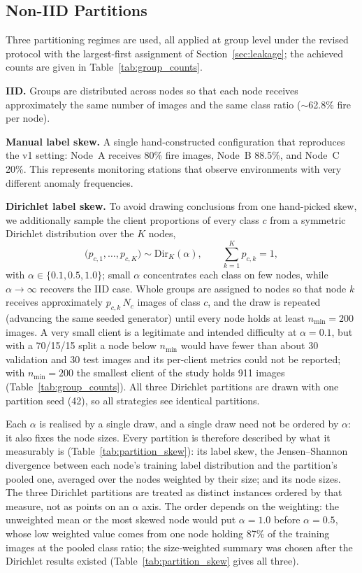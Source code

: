 \documentclass[journal]{IEEEtran}
\begin{document}
\subsection{Non-IID Partitions}
\label{sec:noniid}

Three partitioning regimes are used, all applied at group level under the revised protocol with the largest-first assignment of Section~\ref{sec:leakage}; the achieved counts are given in Table~\ref{tab:group_counts}.

\textbf{IID.} Groups are distributed across nodes so that each node receives approximately the same number of images and the same class ratio ($\sim$62.8\% fire per node).

\textbf{Manual label skew.} A single hand-constructed configuration that reproduces the v1 setting: Node~A receives 80\% fire images, Node~B 88.5\%, and Node~C 20\%. This represents monitoring stations that observe environments with very different anomaly frequencies.

\textbf{Dirichlet label skew.} To avoid drawing conclusions from one hand-picked skew, we additionally sample the client proportions of every class $c$ from a symmetric Dirichlet distribution over the $K$ nodes,
\begin{equation}
\bigl(p_{c,1},\dots,p_{c,K}\bigr) \sim \mathrm{Dir}_K(\alpha), \qquad \sum_{k=1}^{K} p_{c,k} = 1 ,
\label{eq:dirichlet}
\end{equation}
with $\alpha \in \{0.1, 0.5, 1.0\}$; small $\alpha$ concentrates each class on few nodes, while $\alpha \to \infty$ recovers the IID case. Whole groups are assigned to nodes so that node $k$ receives approximately $p_{c,k}\,N_c$ images of class $c$, and the draw is repeated (advancing the same seeded generator) until every node holds at least $n_{\min}=200$ images. A very small client is a legitimate and intended difficulty at $\alpha=0.1$, but with a 70/15/15 split a node below $n_{\min}$ would have fewer than about 30 validation and 30 test images and its per-client metrics could not be reported; with $n_{\min}=200$ the smallest client of the study holds 911 images (Table~\ref{tab:group_counts}). All three Dirichlet partitions are drawn with one partition seed (42), so all strategies see identical partitions.

Each $\alpha$ is realised by a single draw, and a single draw need not be ordered by $\alpha$: it also fixes the node sizes. Every partition is therefore described by what it measurably is (Table~\ref{tab:partition_skew}): its label skew, the Jensen--Shannon divergence between each node's training label distribution and the partition's pooled one, averaged over the nodes weighted by their size; and its node sizes. The three Dirichlet partitions are treated as distinct instances ordered by that measure, not as points on an $\alpha$ axis. The order depends on the weighting: the unweighted mean or the most skewed node would put $\alpha{=}1.0$ before $\alpha{=}0.5$, whose low weighted value comes from one node holding 87\% of the training images at the pooled class ratio; the size-weighted summary was chosen after the Dirichlet results existed (Table~\ref{tab:partition_skew} gives all three).
\end{document}

